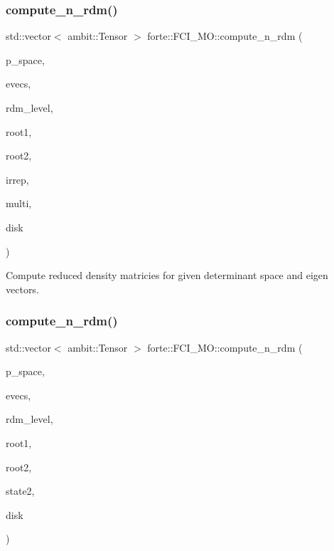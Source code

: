 \subsubsection{\texorpdfstring{compute\+\_\+n\+\_\+rdm()}{compute\_n\_rdm()}\hspace{0.1cm}{\footnotesize\ttfamily [1/3]}}
{\footnotesize\ttfamily std\+::vector$<$ ambit\+::\+Tensor $>$ forte\+::\+F\+C\+I\+\_\+\+M\+O\+::compute\+\_\+n\+\_\+rdm (\begin{DoxyParamCaption}\item[{const \mbox{\hyperlink{fci__mo_8h_a777ccac2de1a8940d2f654e59ff12f06}{vecdet}} \&}]{p\+\_\+space,  }\item[{psi\+::\+Shared\+Matrix}]{evecs,  }\item[{int}]{rdm\+\_\+level,  }\item[{int}]{root1,  }\item[{int}]{root2,  }\item[{int}]{irrep,  }\item[{int}]{multi,  }\item[{bool}]{disk }\end{DoxyParamCaption})\hspace{0.3cm}{\ttfamily [protected]}}



Compute reduced density matricies for given determinant space and eigen vectors. 

\mbox{\label{classforte_1_1_f_c_i___m_o_aff33713f495d3b4e2908e5b9bea78ec3}} 
\subsubsection{\texorpdfstring{compute\+\_\+n\+\_\+rdm()}{compute\_n\_rdm()}\hspace{0.1cm}{\footnotesize\ttfamily [2/3]}}
{\footnotesize\ttfamily std\+::vector$<$ ambit\+::\+Tensor $>$ forte\+::\+F\+C\+I\+\_\+\+M\+O\+::compute\+\_\+n\+\_\+rdm (\begin{DoxyParamCaption}\item[{const \mbox{\hyperlink{fci__mo_8h_a777ccac2de1a8940d2f654e59ff12f06}{vecdet}} \&}]{p\+\_\+space,  }\item[{psi\+::\+Shared\+Matrix}]{evecs,  }\item[{int}]{rdm\+\_\+level,  }\item[{int}]{root1,  }\item[{int}]{root2,  }\item[{const \mbox{\hyperlink{classforte_1_1_state_info}{State\+Info}} \&}]{state2,  }\item[{bool}]{disk }\end{DoxyParamCaption})\hspace{0.3cm}{\ttfamily [protected]}}

